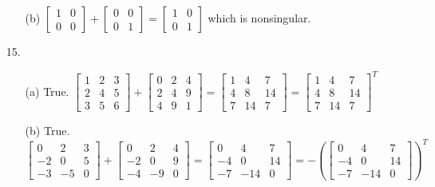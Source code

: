 \documentclass{article}
\begin{document}
\begin{enumerate}
\begin{itemize}
		    \item[(b)]
				$\begin{bmatrix}
					1 & 0 \\ 
					0 & 0
				\end{bmatrix}+\begin{bmatrix}
					0 & 0 \\
					0 & 1
				\end{bmatrix}=\begin{bmatrix}
					1 & 0 \\ 
					0 & 1
				\end{bmatrix}$ 
				which is nonsingular.
		\end{itemize}
	
	\item[15.]
		\begin{itemize}
			\item[(a)]
				True.
				$\begin{bmatrix}
					1 & 2 & 3 \\
					2 & 4 & 5 \\
					3 & 5 & 6
				\end{bmatrix}+\begin{bmatrix}
					0 & 2 & 4 \\
					2 & 4 & 9 \\
					4 & 9 & 1
				\end{bmatrix}=\begin{bmatrix}
					1 & 4 & 7 \\
					4 & 8 & 14 \\
					7 & 14 & 7
				\end{bmatrix}=\begin{bmatrix}
					1 & 4 & 7 \\
					4 & 8 & 14 \\
					7 & 14 & 7
				\end{bmatrix}^T$ 

			\item[(b)]
				True.
				$\begin{bmatrix}
					0 & 2 & 3 \\
					-2 & 0 & 5 \\
					-3 & -5 & 0
				\end{bmatrix}+\begin{bmatrix}
					0 & 2 & 4 \\
					-2 & 0 & 9 \\
					-4 & -9 & 0
				\end{bmatrix}=\begin{bmatrix}
					0 & 4 & 7 \\
					-4 & 0 & 14 \\
					-7 & -14 & 0
				\end{bmatrix}=-\left(\begin{bmatrix}
					0 & 4 & 7 \\
					-4 & 0 & 14 \\
					-7 & -14 & 0
				\end{bmatrix}\right)^T$ 


\end{itemize}
\end{enumerate}
\end{document}
